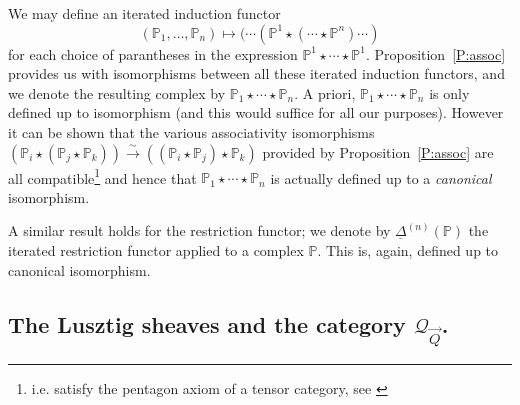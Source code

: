 \documentclass[a4paper,10pt]{amsart}
\numberwithin{equation}{section}
\begin{document}
\vspace{.15in}

We may define an iterated induction functor
$$ (\mathbb{P}_1,  \ldots , \mathbb{P}_n) \mapsto ( \cdots (\mathbb{P}^1 \star ( \cdots \star \mathbb{P}^n) \cdots )$$
for each choice of parantheses in the expression $\mathbb{P}^1 \star \cdots \star \mathbb{P}^1$. Proposition~\ref{P:assoc} provides us with
isomorphisms between all these iterated induction functors, and we denote the resulting complex by $\mathbb{P}_1 \star \cdots \star \mathbb{P}_n$.
A priori, $\mathbb{P}_1 \star \cdots \star \mathbb{P}_n$ is only defined up to isomorphism (and this would suffice for all our purposes). However it can be
shown that the various associativity isomorphisms $(\mathbb{P}_i \star (\mathbb{P}_j \star \mathbb{P}_k)) \stackrel{\sim}{\to} ((\mathbb{P}_i \star \mathbb{P}_j) \star \mathbb{P}_k)$ provided by Proposition~\ref{P:assoc} are all compatible\footnote{i.e. satisfy the pentagon axiom of a tensor category, see \cite{Maclane}} and hence that
$\mathbb{P}_1 \star \cdots \star \mathbb{P}_n$ is actually defined up to a \textit{canonical} isomorphism.

A similar result holds for the restriction functor; we denote by $\underline{\Delta}^{(n)}(\mathbb{P})$ the iterated restriction functor applied to a complex $\mathbb{P}$. This is, again,  defined up to canonical isomorphism.

\vspace{.3in}

\subsection{The Lusztig sheaves and the category $\mathcal{Q}_{\vec{Q}}$.}

\vspace{.15in}
\end{document}
